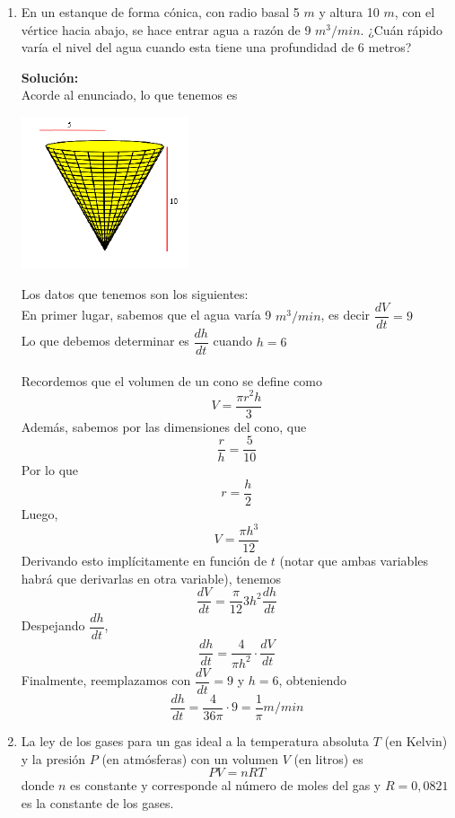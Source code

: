 \documentclass[12pt]{article}
\newenvironment{solucion}
{\begin{mdframed}[backgroundcolor=black!10]
		{\bf Solución:}\\
	}
	{
	\end{mdframed}
}
\newenvironment{preguntas}
{\begin{enumerate}\itemsep12pt
	}
	{
	\end{enumerate}
}
\begin{document}
\begin{preguntas}
\begin{solucion}
Luego,
$$(f^{-1})'(x) = 
\dfrac{1}{f'(f^{-1}(x))} = 
\dfrac{1}{\dfrac{e^{f(f^{-1}(x))}}{1+(f(f^{-1}(x)))^2}}$$
Notemos que 
$$f(f^{-1}(x)) = x$$
Finalmente,
$$(f^{-1})'(x) = \dfrac{1}{\dfrac{e^x}{1+x^2}} = \dfrac{1+x^2}{e^x}$$
\end{solucion}
\item En un estanque de forma cónica, con radio basal 5 $m$ y altura 10 $m$, con el vértice hacia abajo, se hace entrar agua a razón de 9 $m^3/min$. ¿Cuán rápido varía el nivel del agua cuando esta tiene una profundidad de 6 metros?
\begin{solucion}
Acorde al enunciado, lo que tenemos es
\begin{center}
\includegraphics[]{cono.PNG}
\end{center}
Los datos que tenemos son los siguientes:\\
En primer lugar, sabemos que el agua varía 9 $m^3/min$, es decir $\dfrac{dV}{dt} = 9$\\
Lo que debemos determinar es $\dfrac{dh}{dt}$ cuando $h=6$\\
\\
Recordemos que el volumen de un cono se define como
$$V = \dfrac{\pi r^2 h}{3}$$
Además, sabemos por las dimensiones del cono, que
$$\dfrac{r}{h} = \dfrac{5}{10}$$
Por lo que 
$$r = \dfrac{h}{2}$$
Luego,
$$V = \dfrac{\pi h^3}{12}$$
Derivando esto implícitamente en función de $t$ (notar que ambas variables habrá que derivarlas en otra variable), tenemos
$$\dfrac{dV}{dt} = \dfrac{\pi}{12}3h^2\dfrac{dh}{dt}$$
Despejando $\dfrac{dh}{dt}$,
$$\dfrac{dh}{dt} = \dfrac{4}{\pi h^2} \cdot \dfrac{dV}{dt}$$
Finalmente, reemplazamos con $\dfrac{dV}{dt} = 9$ y $h = 6$, obteniendo
$$\dfrac{dh}{dt} = \dfrac{4}{36\pi}\cdot 9 = \dfrac{1}{\pi} m/min$$
\end{solucion}
\item La ley de los gases para un gas ideal a la temperatura absoluta $T$ (en Kelvin) y la presión $P$ (en atmósferas) con un volumen $V$ (en litros) es
$$PV = nRT$$
donde $n$ es constante y corresponde al número de moles del gas y $R = 0,0821$ es la constante de los gases.\\

\end{preguntas}
\end{document}
